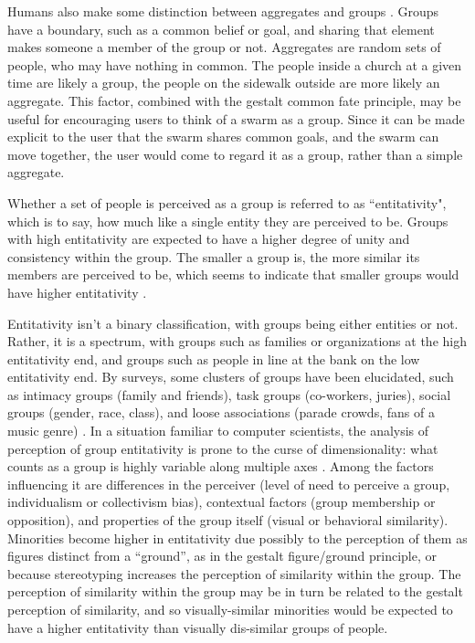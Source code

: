 Humans also make some distinction between aggregates and groups \cite{wilder1978perceiving}.
Groups have a boundary, such as a common belief or goal, and sharing that element makes someone a member of the group or not. 
Aggregates are random sets of people, who may have nothing in common.
The people inside a church at a given time are likely a group, the people on the sidewalk outside are more likely an aggregate. 
This factor, combined with the gestalt common fate principle, may be useful for encouraging users to think of a swarm as a group. 
Since it can be made explicit to the user that the swarm shares common goals, and the swarm can move together, the user would come to regard it as a group, rather than a simple aggregate. 

Whether a set of people is perceived as a group is referred to as ``entitativity", which is to say, how much like a single entity they are perceived to be. 
Groups with high entitativity are expected to have a higher degree of unity and consistency within the group. 
The smaller a group is, the more similar its members are perceived to be, which seems to indicate that smaller groups would have higher entitativity \citep{stewart2003trust}. 

Entitativity isn't a binary classification, with groups being either entities or not. 
Rather, it is a spectrum, with groups such as families or organizations at the high entitativity end, and groups such as people in line at the bank on the low entitativity end. 
By surveys, some clusters of groups have been elucidated, such as intimacy groups (family and friends), task groups (co-workers, juries), social groups (gender, race, class), and loose associations (parade crowds, fans of a music genre) \citep{lickel2001elements}. 
In a situation familiar to computer scientists, the analysis of perception of group entitativity is prone to the curse of dimensionality: what counts as a group is highly variable along multiple axes \citep{lickel2000varieties}.  
Among the factors influencing it are differences in the perceiver (level of need to perceive a group, individualism or collectivism bias), contextual factors (group membership or opposition), and properties of the group itself (visual or behavioral similarity).
Minorities become higher in entitativity due possibly to the perception of them as figures distinct from a ``ground'', as in the gestalt figure/ground principle, or because stereotyping increases the perception of similarity within the group. 
The perception of similarity within the group may be in turn be related to the gestalt perception of similarity, and so visually-similar minorities would be expected to have a higher entitativity than visually dis-similar groups of people. 
	
